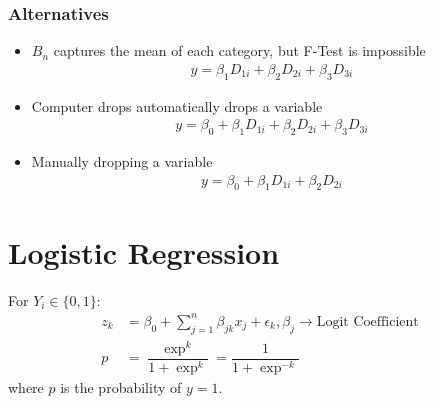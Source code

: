 \documentclass[openany,b5paper]{article}
\begin{document}
\subsubsection{Alternatives}
\begin{itemize}
	\item $B_n$ captures the mean of each category, but F-Test is impossible\begin{align} y = \beta_1 D_{1i} + \beta_2 D_{2i} + \beta_3 D_{3i}\end{align}
	\item Computer drops automatically drops a variable \begin{align} y = \beta_0 + \beta_1 D_{1i} + \beta_2 D_{2i} + \beta_3 D_{3i} \end{align}
	\item Manually dropping a variable \begin{align} y = \beta_0 + \beta_1 D_{1i} + \beta_2 D_{2i} \end{align}
\end{itemize}

\section{Logistic Regression}
For $Y_i \in \lbrace 0,1 \rbrace$:
\begin{align}
	z_k &= \beta_0 + \sum_{j=1}^{n} \beta_{jk} x_j + \epsilon_k, \beta_j \rightarrow \text{Logit Coefficient}\\
	p &= \dfrac{\exp^{k}}{1+\exp^{k}} = \dfrac{1}{1+\exp^{-k}}
\end{align}
where $p$ is the probability of $y=1$.
\end{document}
